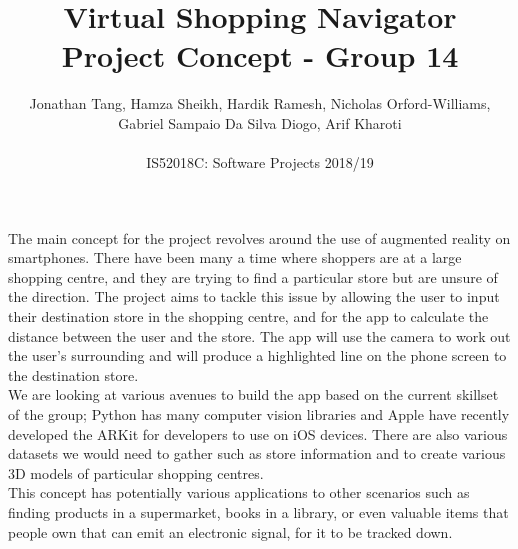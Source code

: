 \documentclass[12pt]{article}
\begin{document}
 
 
 
\title{\textbf{Virtual Shopping Navigator}\\Project Concept - Group 14}%
\author{Jonathan Tang, Hamza Sheikh, Hardik Ramesh, Nicholas Orford-Williams,\\
Gabriel Sampaio Da Silva Diogo, Arif Kharoti\\ %
\\
IS52018C: Software Projects 2018/19} %
 
\maketitle

The main concept for the project revolves around the use of augmented reality on smartphones. There have been many a time where shoppers are at a large shopping centre, and they are trying to find a particular store but are unsure of the direction. The project aims to tackle this issue by allowing the user to input their destination store in the shopping centre, and for the app to calculate the distance between the user and the store. The app will use the camera to work out the user's
surrounding and will produce a highlighted line on the phone screen to the destination store.\\

We are looking at various avenues to build the app based on the current skillset of the group; Python has many computer vision libraries and Apple have recently developed the ARKit for developers to use on iOS devices. There are also various datasets we would need to gather such as store information and to create various 3D models of particular shopping centres.\\

This concept has potentially various applications to other scenarios such as finding products in a supermarket, books in a library, or even valuable items that people own that can emit an electronic signal, for it to be tracked down.

 
\end{document}
